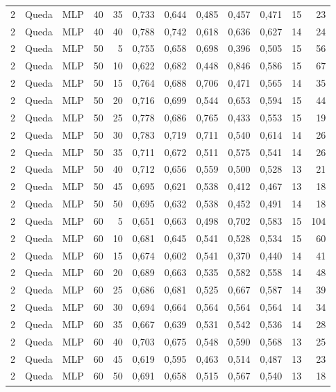 \begin{longtable}{@{}rllrrrrrrrrr@{}}
2 & Queda & MLP & 40 & 35 & 0,733 & 0,644 & 0,485 & 0,457 & 0,471 & 15 & 23 \\
2 & Queda & MLP & 40 & 40 & 0,788 & 0,742 & 0,618 & 0,636 & 0,627 & 14 & 24 \\
2 & Queda & MLP & 50 & 5 & 0,755 & 0,658 & 0,698 & 0,396 & 0,505 & 15 & 56 \\
2 & Queda & MLP & 50 & 10 & 0,622 & 0,682 & 0,448 & 0,846 & 0,586 & 15 & 67 \\
2 & Queda & MLP & 50 & 15 & 0,764 & 0,688 & 0,706 & 0,471 & 0,565 & 14 & 35 \\
2 & Queda & MLP & 50 & 20 & 0,716 & 0,699 & 0,544 & 0,653 & 0,594 & 15 & 44 \\
2 & Queda & MLP & 50 & 25 & 0,778 & 0,686 & 0,765 & 0,433 & 0,553 & 15 & 19 \\
2 & Queda & MLP & 50 & 30 & 0,783 & 0,719 & 0,711 & 0,540 & 0,614 & 14 & 26 \\
2 & Queda & MLP & 50 & 35 & 0,711 & 0,672 & 0,511 & 0,575 & 0,541 & 14 & 26 \\
2 & Queda & MLP & 50 & 40 & 0,712 & 0,656 & 0,559 & 0,500 & 0,528 & 13 & 21 \\
2 & Queda & MLP & 50 & 45 & 0,695 & 0,621 & 0,538 & 0,412 & 0,467 & 13 & 18 \\
2 & Queda & MLP & 50 & 50 & 0,695 & 0,632 & 0,538 & 0,452 & 0,491 & 14 & 18 \\
2 & Queda & MLP & 60 & 5 & 0,651 & 0,663 & 0,498 & 0,702 & 0,583 & 15 & 104 \\
2 & Queda & MLP & 60 & 10 & 0,681 & 0,645 & 0,541 & 0,528 & 0,534 & 15 & 60 \\
2 & Queda & MLP & 60 & 15 & 0,674 & 0,602 & 0,541 & 0,370 & 0,440 & 14 & 41 \\
2 & Queda & MLP & 60 & 20 & 0,689 & 0,663 & 0,535 & 0,582 & 0,558 & 14 & 48 \\
2 & Queda & MLP & 60 & 25 & 0,686 & 0,681 & 0,525 & 0,667 & 0,587 & 14 & 39 \\
2 & Queda & MLP & 60 & 30 & 0,694 & 0,664 & 0,564 & 0,564 & 0,564 & 14 & 34 \\
2 & Queda & MLP & 60 & 35 & 0,667 & 0,639 & 0,531 & 0,542 & 0,536 & 14 & 28 \\
2 & Queda & MLP & 60 & 40 & 0,703 & 0,675 & 0,548 & 0,590 & 0,568 & 13 & 25 \\
2 & Queda & MLP & 60 & 45 & 0,619 & 0,595 & 0,463 & 0,514 & 0,487 & 13 & 23 \\
2 & Queda & MLP & 60 & 50 & 0,691 & 0,658 & 0,515 & 0,567 & 0,540 & 13 & 18 \\

\end{longtable}

